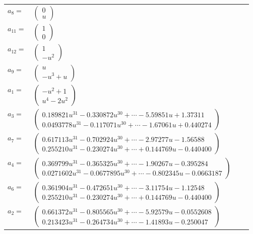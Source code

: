 \documentclass[1p]{elsarticle_modified}
\theoremstyle{definition}
\begin{document}
\begin{tabular}{m{7pt} m{180pt} m{7pt} m{180pt} }
\flushright $a_{8}=$&$\begin{pmatrix}0\\u\end{pmatrix}$ \\
\flushright $a_{11}=$&$\begin{pmatrix}1\\0\end{pmatrix}$ \\
\flushright $a_{12}=$&$\begin{pmatrix}1\\- u^2\end{pmatrix}$ \\
\flushright $a_{9}=$&$\begin{pmatrix}u\\- u^3+u\end{pmatrix}$ \\
\flushright $a_{1}=$&$\begin{pmatrix}- u^2+1\\u^4-2 u^2\end{pmatrix}$ \\
\flushright $a_{3}=$&$\begin{pmatrix}0.189821 u^{31}-0.330872 u^{30}+\cdots-5.59851 u+1.37311\\0.0493778 u^{31}-0.117071 u^{30}+\cdots-1.67061 u+0.440274\end{pmatrix}$ \\
\flushright $a_{7}=$&$\begin{pmatrix}0.617113 u^{31}-0.702924 u^{30}+\cdots-2.97277 u-1.56588\\0.255210 u^{31}-0.230274 u^{30}+\cdots+0.144769 u-0.440400\end{pmatrix}$ \\
\flushright $a_{4}=$&$\begin{pmatrix}0.369799 u^{31}-0.365325 u^{30}+\cdots-1.90267 u-0.395284\\0.0271602 u^{31}-0.0677895 u^{30}+\cdots-0.802345 u-0.0663187\end{pmatrix}$ \\
\flushright $a_{6}=$&$\begin{pmatrix}0.361904 u^{31}-0.472651 u^{30}+\cdots-3.11754 u-1.12548\\0.255210 u^{31}-0.230274 u^{30}+\cdots+0.144769 u-0.440400\end{pmatrix}$ \\
\flushright $a_{2}=$&$\begin{pmatrix}0.661372 u^{31}-0.805565 u^{30}+\cdots-5.92579 u-0.0552608\\0.213423 u^{31}-0.264734 u^{30}+\cdots-1.41893 u-0.250047\end{pmatrix}$ \\

\end{tabular}
\end{document}

